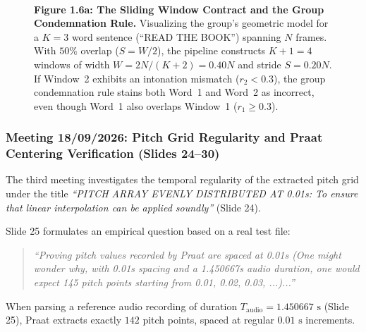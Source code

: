 \documentclass[11pt,a4paper]{article}
\begin{document}
\begin{figure}[htbp]
\centering
\resizebox{0.92\textwidth}{!}{}\\[3pt]
\caption{\textbf{Figure 1.6a: The Sliding Window Contract and the Group Condemnation Rule.} Visualizing the group's geometric model for a $K = 3$ word sentence (``READ THE BOOK'') spanning $N$ frames. With $50\%$ overlap ($S = W/2$), the pipeline constructs $K+1 = 4$ windows of width $W = 2N/(K+2) = 0.40N$ and stride $S = 0.20N$. If Window~2 exhibits an intonation mismatch ($r_2 < 0.3$), the group condemnation rule stains both Word~1 and Word~2 as incorrect, even though Word~1 also overlaps Window~1 ($r_1 \ge 0.3$).}
\label{fig:1_6a}
\end{figure}

\subsubsection*{Meeting 18/09/2026: Pitch Grid Regularity and Praat Centering Verification (Slides 24--30)}

The third meeting investigates the temporal regularity of the extracted pitch grid under the title \textit{``PITCH ARRAY EVENLY DISTRIBUTED AT 0.01s: To ensure that linear interpolation can be applied soundly''} (Slide 24).

Slide 25 formulates an empirical question based on a real test file:
\begin{quote}
\textit{``Proving pitch values recorded by Praat are spaced at 0.01s (One might wonder why, with 0.01s spacing and a 1.450667s audio duration, one would expect 145 pitch points starting from 0.01, 0.02, 0.03, ...)...''}
\end{quote}
When parsing a reference audio recording of duration $T_{\text{audio}} = 1.450667\text{ s}$ (Slide 25), Praat extracts exactly $142$ pitch points, spaced at regular $0.01\text{ s}$ increments.
\end{document}
